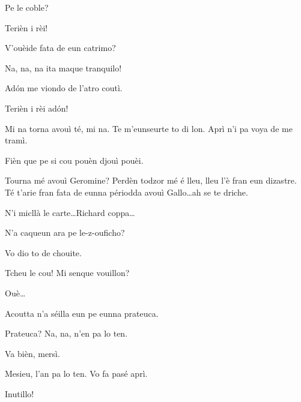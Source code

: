\begin{drama}
\Gerominespeaks Pe le coble?

\Tuenospeaks Terièn i rèi!

\Spritzspeaks{} V'ouèide fata de eun catrimo?

\Tcheuttespeaks Na, na, na ita maque tranquilo!

\Spritzspeaks Ad\'on me viondo de l'atro coutì.


\Tuenospeaks Terièn i rèi ad\'on!


\Gerominespeaks Mi na torna avouì té, mi na. Te m'eunseurte to di lon. Aprì n'i pa voya de me tramì.

\Saventaspeaks Fièn que pe si cou pouèn djouì pouèi.

\Richardspeaks Tourna mé avouì Geromine? Perdèn todzor mé é lleu, lleu l'è fran eun dizastre. Té t'arie fran fata de eunna périodda avouì Gallo\ldots ah se te driche.

\Tuenospeaks N'i micllà le carte\ldots Richard coppa\ldots





\Genespeaks{} N'a caqueun ara pe le-z-ouficho?

\Sandrinospeaks Vo dio to de chouite.


\Tuenospeaks Tcheu le cou! Mi senque vouillon?


\Tuenospeaks Ouè\ldots

\Sandrinospeaks Acoutta n'a séilla eun pe eunna prateuca.

\Tuenospeaks Prateuca? Na, na, n'en pa lo ten.

\Sandrinospeaks Va bièn, mersì.


\Sandrinospeaks{} Mesieu, l'an pa lo ten. Vo fa pasé aprì.

\Genespeaks{} Inutillo!


\end{drama}
